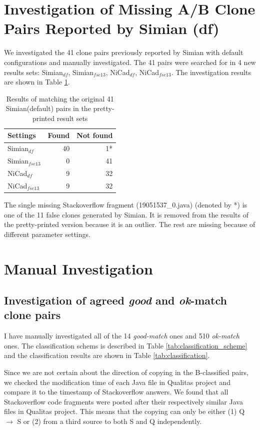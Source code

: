 \documentclass{IEEEtran}
\begin{document}
\section*{Investigation of Missing A/B Clone Pairs Reported by Simian (df)}
We investigated the 41 clone pairs previously reported by Simian with default configurations and manually investigated. The 41 pairs were searched for in 4 new results sets: Simian$_{df}$, Simian$_{fse13}$, NiCad$_{df}$, NiCad$_{fse13}$. The investigation results are shown in Table \ref{tab:search}.

\begin{table}[H]
	\centering
	\caption{Results of matching the original 41 Simian(default) pairs in the pretty-printed result sets}
	\label{tab:search}
	\begin{tabular}{l|r|r}
		\hline 
		Settings & Found & Not found \\ 
		\hline 
		Simian$_{df}$  &  40 & 1* \\ 
		\hline 
		Simian$_{fse13}$ & 0 & 41  \\ 
		\hline 
		NiCad$_{df}$  & 9 & 32 \\ 
		\hline 
		NiCad$_{fse13}$ &  9 & 32 \\ 
		\hline 
	\end{tabular} 
\end{table}

The single missing Stackoverflow fragment (19051537\_0.java) (denoted by *) is one of the 11 false clones generated by Simian. It is removed from the results of the pretty-printed version because it is an outlier. The rest are missing because of different parameter settings.


\section*{Manual Investigation}

\subsection{Investigation of agreed \textit{good} and \textit{ok}-match clone pairs}
I have manually investigated all of the 14 \textit{good-match} ones and 510 \textit{ok-match} ones. The classification schems is described in Table \ref{tab:classification_scheme} and the classification results are shown in Table \ref{tab:classification}. 

Since we are not certain about the direction of copying in the B-classified pairs, we checked the modification time of each Java file in Qualitas project and compare it to the timestamp of Stackoverflow answers. We found that all Stackoverflow code fragments were posted after their respectively similar Java files in Qualitas project. This means that the copying can only be either (1) Q $\rightarrow$ S or (2) from a third source to both S and Q independently.
\end{document}
